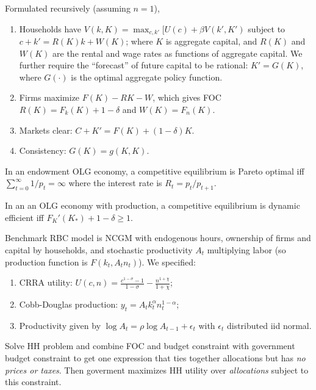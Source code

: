 \documentclass[8pt,letterpaper, landscape]{extarticle} %
\renewcommand{\ln}{\log}
\begin{document}
\begin{multicols}{3}
\begin{description}
Formulated recursively (assuming $ n=1 $),
\begin{enumerate}
\item Households have $ V(k, K) = \max_{c, k'} [U(c) + \beta V(k', K') $ subject to $ c + k' = R(K) k + W(K) $; where $ K $ is aggregate capital, and $ R(K) $ and $ W(K) $ are the rental and wage rates as functions of aggregate capital. We further require the ``forecast'' of future capital to be rational: $ K' = G(K) $, where $ G (\cdot) $ is the optimal aggregate policy function.
\item Firms maximize $ F(K) - R K - W $, which gives FOC $ R(K) = F_k(K) + 1- \delta $ and $ W(K) = F_n(K) $.
\item Markets clear: $ C + K' = F(K) + (1-\delta) K $.
\item Consistency: $ G(K) = g(K, K) $.
\end{enumerate}

 In an endowment OLG economy, a competitive equilibrium is Pareto optimal iff $ \sum_{t=0}^{\infty} 1 / p_t = \infty $ where the interest rate is $ R_t = p_t / p_{t+1} $.

In an an OLG economy with production, a competitive equilibrium is dynamic efficient iff $ F_{K}' (K_*) + 1 - \delta \geq 1 $.

 Benchmark RBC model is NCGM with endogenous hours, ownership of firms and capital by households, and stochastic productivity $ A_t $ multiplying labor (so production function is $ F(k_t, A_t n_t) $). We specified:
\begin{enumerate}
\item CRRA utility: $ U(c,n) = \frac{c^{1 - \sigma} - 1}{1 - \sigma} - \frac{n^{1 + \chi}}{1 + \chi} $;
\item Cobb-Douglas production: $ y_t = A_t k_t^{\alpha} n_t^{1 - \alpha} $;
\item Productivity given by $ \ln A_t = \rho \ln A_{t-1} + \epsilon_t $ with $ \epsilon_t $ distributed iid normal.
\end{enumerate}

 Solve HH problem and combine FOC and budget constraint with government budget constraint to get one expression that ties together allocations but has \textit{no prices or taxes}. Then goverment maximizes HH utility over \textit{allocations} subject to this constraint.


\end{description}
\end{multicols}
\end{document}
